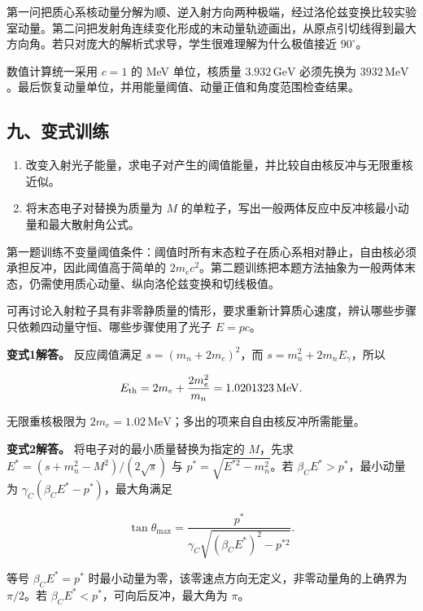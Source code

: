 \documentclass[12pt,a4paper,UTF8]{ctexart}
\newcommand{\tightlist}{\setlength{\itemsep}{0pt}\setlength{\parskip}{0pt}}
\begin{document}
第一问把质心系核动量分解为顺、逆入射方向两种极端，经过洛伦兹变换比较实验室动量。第二问把发射角连续变化形成的末动量轨迹画出，从原点引切线得到最大方向角。若只对庞大的解析式求导，学生很难理解为什么极值接近
\(90^\circ\)。

数值计算统一采用 \(c=1\) 的 MeV 单位，核质量 \(3.932\,\mathrm{GeV}\)
必须先换为
\(3932\,\mathrm{MeV}\)。最后恢复动量单位，并用能量阈值、动量正值和角度范围检查结果。

\subsection{九、变式训练}\label{ux4e5dux53d8ux5f0fux8badux7ec3-7}

\begin{enumerate}
\def\labelenumi{\arabic{enumi}.}
\tightlist
\item
  改变入射光子能量，求电子对产生的阈值能量，并比较自由核反冲与无限重核近似。
\item
  将末态电子对替换为质量为 \(M\)
  的单粒子，写出一般两体反应中反冲核最小动量和最大散射角公式。
\end{enumerate}

第一题训练不变量阈值条件：阈值时所有末态粒子在质心系相对静止，自由核必须承担反冲，因此阈值高于简单的
\(2m_ec^2\)。第二题训练把本题方法抽象为一般两体末态，仍需使用质心动量、纵向洛伦兹变换和切线极值。

可再讨论入射粒子具有非零静质量的情形，要求重新计算质心速度，辨认哪些步骤只依赖四动量守恒、哪些步骤使用了光子
\(E=pc\)。

\textbf{变式1解答。} 反应阈值满足 \(s=(m_n+2m_e)^2\)，而
\(s=m_n^2+2m_nE_\gamma\)，所以

\[E_{\rm th}=2m_e+\frac{2m_e^2}{m_n}=1.0201323\,\mathrm{MeV}.\]

无限重核极限为
\(2m_e=1.02\,\mathrm{MeV}\)；多出的项来自自由核反冲所需能量。

\textbf{变式2解答。} 将电子对的最小质量替换为指定的 \(M\)，先求
\(E^*=(s+m_n^2-M^2)/(2\sqrt s)\) 与 \(p^*=\sqrt{E^{*2}-m_n^2}\)。若
\(\beta_CE^*>p^*\)，最小动量为 \(\gamma_C(\beta_CE^*-p^*)\)，最大角满足

\[\tan\theta_{\max}=\frac{p^*}{\gamma_C\sqrt{(\beta_CE^*)^2-p^{*2}}}.\]

等号 \(\beta_CE^*=p^*\)
时最小动量为零，该零速点方向无定义，非零动量角的上确界为 \(\pi/2\)。若
\(\beta_CE^*<p^*\)，可向后反冲，最大角为 \(\pi\)。
\end{document}
